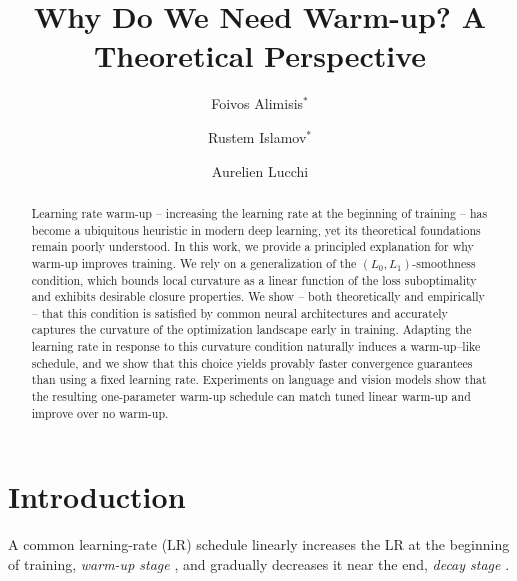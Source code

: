 \documentclass[a4paper,11pt]{article}
\title{
\toptitlebar
{{\center\baselineskip 18pt
                      {\Large\bf Why Do We Need Warm-up? A Theoretical Perspective}}
} 
\bottomtitlebar}
\date{}
\author[1]{Foivos Alimisis$^*$}
\author[1]{Rustem Islamov$^*$}
\author[1]{Aurelien Lucchi}
\affil[1]{University of Basel, Switzerland}
\newcommand{\1}{\mathbbm{1}}
\theoremstyle{plain}
\begin{document}
\maketitle

\def\thefootnote{*}\def\thefootnote{\arabic{footnote}}
\begin{abstract}
  Learning rate warm-up -- increasing the learning rate at the beginning of training -- has become a ubiquitous heuristic in modern deep learning, yet its theoretical foundations remain poorly understood. In this work, we provide a principled explanation for why warm-up improves training. We rely on a generalization of the $(L_0, L_1)$-smoothness condition, which bounds local curvature as a linear function of the loss suboptimality and exhibits desirable closure properties. We show -- both theoretically and empirically -- that this condition is satisfied by common neural architectures and accurately captures the curvature of the optimization landscape early in training. Adapting the learning rate in response to this curvature condition naturally induces a warm-up–like schedule, and we show that this choice yields provably faster convergence guarantees than using a fixed learning rate. Experiments on language and vision models show that the resulting one-parameter warm-up schedule can match tuned linear warm-up and improve over no warm-up.
\end{abstract}

\section{Introduction}


A common learning-rate (LR) schedule linearly increases the LR at the beginning of training, {\it warm-up stage} \citep{goyal2017accurate, vaswani2017attention}, and gradually decreases it near the end, {\it decay stage} \citep{loshchilov2016sgdr, vaswani2017attention, hoffmann2022empirical, zhang2023dive, dremov2025training}.
\end{document}

